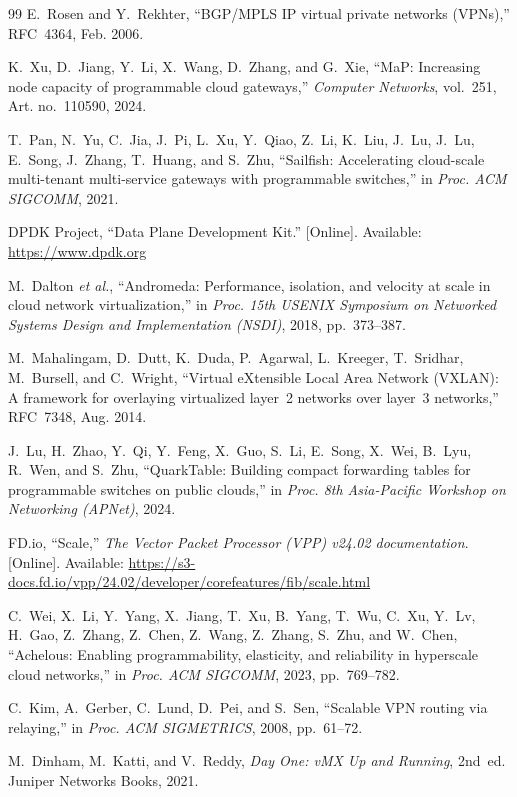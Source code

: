 \documentclass[11pt,a4paper,oneside]{report}
\begin{document}
\begin{thebibliography}{99}
E.~Rosen and Y.~Rekhter, ``BGP/MPLS IP virtual private networks (VPNs),''
RFC~4364, Feb. 2006.

K.~Xu, D.~Jiang, Y.~Li, X.~Wang, D.~Zhang, and G.~Xie, ``MaP: Increasing node
capacity of programmable cloud gateways,'' \emph{Computer Networks}, vol.~251,
Art. no.~110590, 2024.

T.~Pan, N.~Yu, C.~Jia, J.~Pi, L.~Xu, Y.~Qiao, Z.~Li, K.~Liu, J.~Lu, J.~Lu,
E.~Song, J.~Zhang, T.~Huang, and S.~Zhu, ``Sailfish: Accelerating cloud-scale
multi-tenant multi-service gateways with programmable switches,'' in
\emph{Proc. ACM SIGCOMM}, 2021.

DPDK Project, ``Data Plane Development Kit.'' [Online]. Available:
\url{https://www.dpdk.org}

M.~Dalton \emph{et al.}, ``Andromeda: Performance, isolation, and velocity at
scale in cloud network virtualization,'' in \emph{Proc. 15th USENIX Symposium on
Networked Systems Design and Implementation (NSDI)}, 2018, pp.~373--387.

M.~Mahalingam, D.~Dutt, K.~Duda, P.~Agarwal, L.~Kreeger, T.~Sridhar,
M.~Bursell, and C.~Wright, ``Virtual eXtensible Local Area Network (VXLAN): A
framework for overlaying virtualized layer~2 networks over layer~3 networks,''
RFC~7348, Aug. 2014.

J.~Lu, H.~Zhao, Y.~Qi, Y.~Feng, X.~Guo, S.~Li, E.~Song, X.~Wei, B.~Lyu, R.~Wen,
and S.~Zhu, ``QuarkTable: Building compact forwarding tables for programmable
switches on public clouds,'' in \emph{Proc. 8th Asia-Pacific Workshop on
Networking (APNet)}, 2024.

FD.io, ``Scale,'' \emph{The Vector Packet Processor (VPP) v24.02
documentation}. [Online]. Available:
\url{https://s3-docs.fd.io/vpp/24.02/developer/corefeatures/fib/scale.html}

C.~Wei, X.~Li, Y.~Yang, X.~Jiang, T.~Xu, B.~Yang, T.~Wu, C.~Xu, Y.~Lv, H.~Gao,
Z.~Zhang, Z.~Chen, Z.~Wang, Z.~Zhang, S.~Zhu, and W.~Chen, ``Achelous: Enabling
programmability, elasticity, and reliability in hyperscale cloud networks,'' in
\emph{Proc. ACM SIGCOMM}, 2023, pp.~769--782.

C.~Kim, A.~Gerber, C.~Lund, D.~Pei, and S.~Sen, ``Scalable VPN routing via
relaying,'' in \emph{Proc. ACM SIGMETRICS}, 2008, pp.~61--72.

M.~Dinham, M.~Katti, and V.~Reddy, \emph{Day One: vMX Up and Running}, 2nd~ed.
Juniper Networks Books, 2021.


\end{thebibliography}
\end{document}
